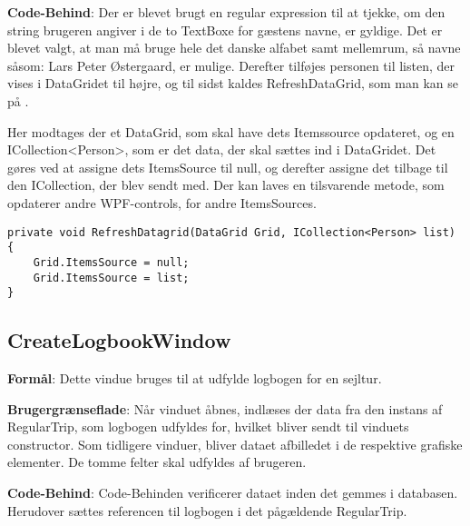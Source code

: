 \textbf{Code-Behind}: 
Der er blevet brugt en regular expression til at tjekke, om den string brugeren angiver i de to TextBoxe for gæstens navne, er gyldige. 
Det er blevet valgt, at man må bruge hele det danske alfabet samt mellemrum, så navne såsom: Lars Peter Østergaard, er mulige.
Derefter tilføjes personen til listen, der vises i DataGridet til højre, og til sidst kaldes RefreshDataGrid, som man kan se på .

Her modtages der et DataGrid, som skal have dets Itemssource opdateret, og en ICollection<Person>, som er det data, der skal sættes ind i DataGridet. 
Det gøres ved at assigne dets ItemsSource til null, og derefter assigne det tilbage til den ICollection, der blev sendt med. 
Der kan laves en tilsvarende metode, som opdaterer andre WPF-controls, for andre ItemsSources.

\begin{lstlisting}[frame=single, caption=Refresh Datagrid, label=RefreshDatagrid]
private void RefreshDatagrid(DataGrid Grid, ICollection<Person> list)
{
    Grid.ItemsSource = null;
    Grid.ItemsSource = list;
}
\end{lstlisting}

\subsection{CreateLogbookWindow}

\textbf{Formål}: 
Dette vindue bruges til at udfylde logbogen for en sejltur.

\textbf{Brugergrænseflade}:  
Når vinduet åbnes, indlæses der data fra den instans af RegularTrip, som logbogen udfyldes for, hvilket bliver sendt til vinduets constructor.
Som tidligere vinduer, bliver dataet afbilledet i de respektive grafiske elementer. 
De tomme felter skal udfyldes af brugeren.

\textbf{Code-Behind}: 
Code-Behinden verificerer dataet inden det gemmes i databasen.
Herudover sættes referencen til logbogen i det pågældende RegularTrip.

